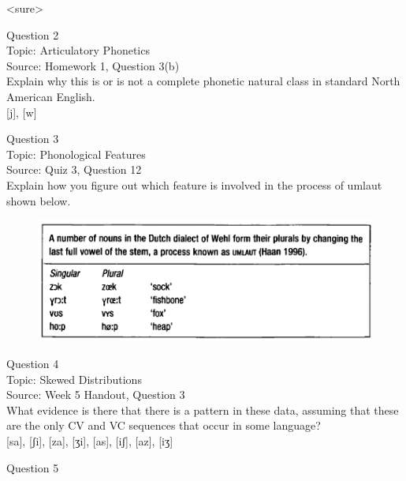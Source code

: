 \documentclass[12pt]{article}
\begin{document}
<sure>


\newpage

{\large Question 2}\\

Topic: Articulatory Phonetics\\
Source: Homework 1, Question 3(b)\\

Explain why this is or is not a complete phonetic natural class in standard North American English.\\

{[j]}, {[w]}


\newpage

{\large Question 3}\\

Topic: Phonological Features\\
Source: Quiz 3, Question 12\\

Explain how you figure out which feature is involved in the process of umlaut shown below.\\

\begin{figure}[H]
\includegraphics{../images/dutch.png}
\end{figure}

\newpage

{\large Question 4}\\

Topic: Skewed Distributions\\
Source: Week 5 Handout, Question 3\\

What evidence is there that there is a pattern in these data, assuming that these are the only CV and VC sequences that occur in some language?\\

{[sa]}, {[ʃi]}, {[za]}, {[ʒi]}, {[as]}, {[iʃ]}, {[az]}, {[iʒ]}


\newpage

{\large Question 5}\\
\end{document}
